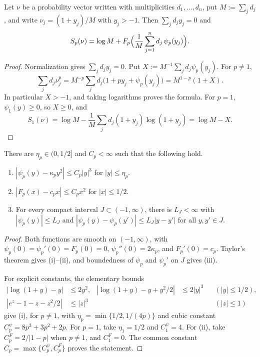 \begin{proposition}
\label{prop:app-exact-expansion}
Let \(\nu\) be a probability vector written with multiplicities
\(d_1,\ldots,d_n\), put \(M:=\sum_jd_j\), and write
\(\nu_j=(1+y_j)/M\) with \(y_j>-1\).  Then \(\sum_jd_jy_j=0\) and
\begin{equation}
    S_p(\nu)
    =\log M+F_p\Bigl(\frac1M\sum_{j=1}^nd_j\,\psi_p(y_j)\Bigr).
    \label{eq:app-exact-expansion}
\end{equation}
\end{proposition}
 
\begin{proof}
Normalization gives \(\sum_jd_jy_j=0\). Put
\(X:=M^{-1}\sum_jd_j\psi_p(y_j)\). For \(p\neq1\),
\begin{equation}
    \sum_jd_j\nu_j^p
    =M^{-p}\sum_jd_j\bigl(1+py_j+\psi_p(y_j)\bigr)
    =M^{1-p}(1+X).
\end{equation}
In particular \(X>-1\), and taking logarithms proves the formula.
For \(p=1\), \(\psi_1(y)\geq0\), so \(X\geq0\), and
\begin{equation}
    S_1(\nu)
    =\log M-\frac1M\sum_jd_j(1+y_j)\log(1+y_j)
    =\log M-X.
\end{equation}
\end{proof}
 
\begin{proposition}
\label{prop:app-local-bounds}
There are \(\eta_p\in(0,1/2]\) and \(C_p<\infty\) such that the following
hold.
\begin{enumerate}[label=\textup{(\roman*)}]
\item \(|\psi_p(y)-\kappa_py^2|\le C_p|y|^3\) for \(|y|\le\eta_p\).
\item \(|F_p(x)-c_px|\le C_px^2\) for \(|x|\le1/2\).
\item For every compact interval \(J\subset(-1,\infty)\), there is
\(L_J<\infty\) with \(|\psi_p(y)|\le L_J\) and
\(|\psi_p(y)-\psi_p(y')|\le L_J|y-y'|\) for all \(y,y'\in J\).
\end{enumerate}
\end{proposition}
 
\begin{proof}
Both functions are smooth on \((-1,\infty)\), with
\(\psi_p(0)=\psi_p'(0)=F_p(0)=0\),
\(\psi_p''(0)=2\kappa_p\), and \(F_p'(0)=c_p\).
Taylor's theorem gives (i)--(ii), and boundedness of \(\psi_p\) and
\(\psi_p'\) on \(J\) gives (iii).

For explicit constants, the elementary bounds
\begin{align}
    |\log(1+y)-y|&\leq2y^2,
    &|\log(1+y)-y+y^2/2|&\leq2|y|^3
       &&(|y|\leq1/2),\\
    |e^z-1-z-z^2/2|&\leq|z|^3
       &&&&(|z|\leq1)
\end{align}
give (i), for \(p\neq1\), with
\(\eta_p=\min\{1/2,1/(4p)\}\) and cubic constant
\(C_p^{\psi}=8p^3+3p^2+2p\). For \(p=1\), take
\(\eta_1=1/2\) and \(C_1^{\psi}=4\).
For (ii), take \(C_p^F=2/|1-p|\) when \(p\neq1\), and
\(C_1^F=0\). The common constant
\(C_p=\max\{C_p^{\psi},C_p^F\}\) proves the statement.
\end{proof}
 
